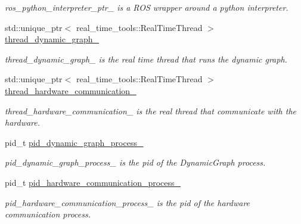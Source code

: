 \begin{DoxyCompactItemize}
\begin{DoxyCompactList}\small\item\em ros\+\_\+python\+\_\+interpreter\+\_\+ptr\+\_\+ is a R\+OS wrapper around a python interpreter. \end{DoxyCompactList}\item 
\mbox{\label{classdynamic__graph_1_1DynamicGraphManager_aee7d35de31cdb05958c1b4f539c290ae}} 
std\+::unique\+\_\+ptr$<$ real\+\_\+time\+\_\+tools\+::\+Real\+Time\+Thread $>$ \hyperlink{classdynamic__graph_1_1DynamicGraphManager_aee7d35de31cdb05958c1b4f539c290ae}{thread\+\_\+dynamic\+\_\+graph\+\_\+}
\begin{DoxyCompactList}\small\item\em thread\+\_\+dynamic\+\_\+graph\+\_\+ is the real time thread that runs the dynamic graph. \end{DoxyCompactList}\item 
\mbox{\label{classdynamic__graph_1_1DynamicGraphManager_ae0e1a3c59fa7d0282529e1a544e83b4d}} 
std\+::unique\+\_\+ptr$<$ real\+\_\+time\+\_\+tools\+::\+Real\+Time\+Thread $>$ \hyperlink{classdynamic__graph_1_1DynamicGraphManager_ae0e1a3c59fa7d0282529e1a544e83b4d}{thread\+\_\+hardware\+\_\+communication\+\_\+}
\begin{DoxyCompactList}\small\item\em thread\+\_\+hardware\+\_\+communication\+\_\+ is the real thread that communicate with the hardware. \end{DoxyCompactList}\item 
pid\+\_\+t \hyperlink{classdynamic__graph_1_1DynamicGraphManager_aa8aa645099e7e9cce426381e38b5027d}{pid\+\_\+dynamic\+\_\+graph\+\_\+process\+\_\+}
\begin{DoxyCompactList}\small\item\em pid\+\_\+dynamic\+\_\+graph\+\_\+process\+\_\+ is the pid of the Dynamic\+Graph process. \end{DoxyCompactList}\item 
pid\+\_\+t \hyperlink{classdynamic__graph_1_1DynamicGraphManager_a02232cdc5cabca34d07dada6ced38532}{pid\+\_\+hardware\+\_\+communication\+\_\+process\+\_\+}
\begin{DoxyCompactList}\small\item\em pid\+\_\+hardware\+\_\+communication\+\_\+process\+\_\+ is the pid of the hardware communication process. \end{DoxyCompactList}\item 

\end{DoxyCompactItemize}
